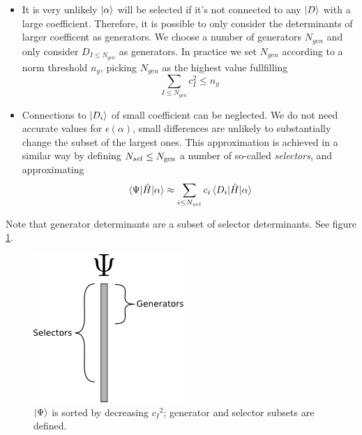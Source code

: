 \documentclass[./thesis.tex]{subfiles}
\begin{document}
\begin{itemize}
\item
It is very unlikely $\ket \alpha$ will be selected if it's not connected to any $\ket D$ with a large coefficient. Therefore, it is possible to only consider the determinants of larger coefficent as generators. We choose a number of generators $N_{gen}$ and only consider $D_{I \leq N_{gen}}$ as generators. In practice we set $N_{gen}$ according to a norm threshold $n_g$, picking $N_{gen}$ as the highest value fullfilling
\begin{equation}
\sum_{I \leq N_{gen}} c_I^2 \leq n_g
\end{equation}
\item
Connections to $\ket {D_i}$ of small coefficient can be neglected. We do not need accurate values for $\epsilon(\alpha)$, small differences are unlikely to substantially change the subset of the largest ones. This approximation is achieved in a similar way by defining $N_{sel} \leq {N_\text{gen}}$ a number of so-called \emph{selectors}, and approximating
\begin{equation}
  \mel{\Psi}{\hat{H}}{\alpha} \approx \sum_{i \leq N_{sel}} c_i \mel{D_i}{\hat{H}}{\alpha}
\end{equation}

\end{itemize}

Note that generator determinants are a subset of selector determinants. See figure \ref{fig:generators_selectors}.


\begin{figure}[h!]
	
	\begin{center}
		\includegraphics[width=0.4\columnwidth]{figures/cipsi/selexemple2}
		\caption{$\ket \Psi$ is sorted by decreasing ${c_I}^2$; generator and selector subsets are defined.}
		\label{fig:generators_selectors}
	\end{center}
\end{figure}
\end{document}
